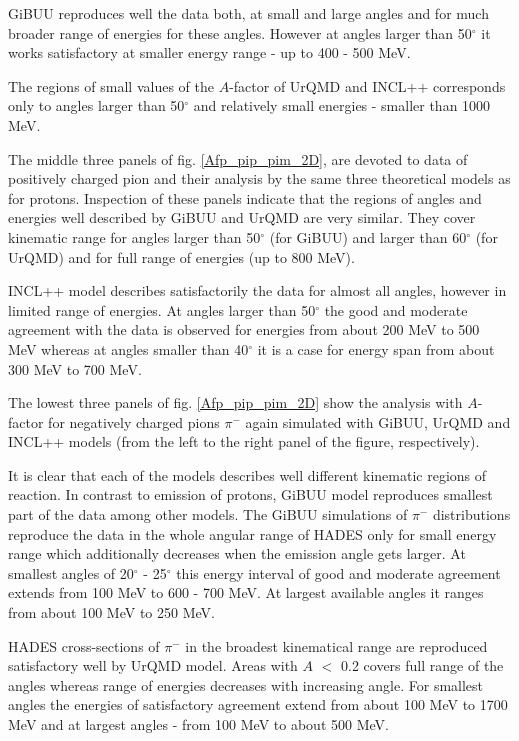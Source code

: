 GiBUU reproduces well the data both, at small and large angles 
and for much broader range of energies for these angles.
However at angles larger than 50$^{\circ}$ it works satisfactory 
at smaller energy range - up to 400 - 500 MeV.
\par
The regions of small values of the $A$-factor of UrQMD and INCL++ corresponds only to angles larger than 50$^{\circ}$ and relatively small energies - smaller than 1000 MeV. 

The middle three panels of fig. \ref{Afp_pip_pim_2D}, 
are devoted to data of positively charged pion and 
their analysis by the same three theoretical models as for protons. 
Inspection of these panels indicate that the regions of angles and energies well described by GiBUU and UrQMD are very similar.  
They cover kinematic range for angles larger than 50$^{\circ}$ (for
GiBUU) and larger than 60$^{\circ}$ (for UrQMD) and for full range of energies (up to 800 MeV). 

INCL++ model describes satisfactorily the data for almost all
angles, however in limited range of energies. 
At angles larger than 50$^{\circ}$ the good and moderate agreement 
with the data is observed  for energies from about 200 MeV to
500 MeV whereas at angles smaller than 40$^{\circ}$ it is a case for energy span from about 300 MeV to 700 MeV.

The lowest three panels of fig. \ref{Afp_pip_pim_2D} show 
the analysis with $A$-factor for negatively charged pions $\pi^{-}$ again simulated with GiBUU, UrQMD and INCL++ models (from the left to the right panel of the figure, respectively). 

It is clear that each of the models describes well  
different kinematic regions of reaction.
In contrast to emission of protons, GiBUU model reproduces smallest part of the data among other models.  
The GiBUU simulations of $\pi^{-}$ distributions reproduce the data 
in the whole angular range of HADES only for small energy range which additionally decreases when the emission angle gets larger. 
At smallest angles of 20$^{\circ}$ - 25$^{\circ}$ this energy interval of good and moderate agreement extends from 100 MeV to 600 - 700 MeV. 
At largest available angles it ranges from about 100 MeV to 250 MeV. 

HADES cross-sections of $\pi^{-}$ in the broadest kinematical range 
are reproduced satisfactory well by UrQMD model.
Areas with $A$ $<$ 0.2 covers full range of the angles whereas 
range of energies decreases with increasing angle. 
For smallest angles the energies of satisfactory agreement extend 
from about 100 MeV to 1700 MeV and at largest angles -  from 100 MeV to about 500 MeV. 

